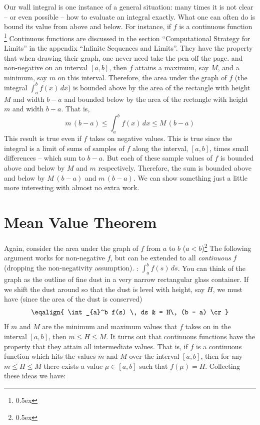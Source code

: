 Our wall integral is one instance of a general situation: many times it is
not clear -- or even possible -- how to evaluate an integral exactly. What one
can often do is bound its value from above and below.
For instance, if $f$ is a continuous function%
\footnote{\kern 0.5pt \raise 0.5ex \hbox{\dag}}%
{Continuous functions are discussed in the section ``Computational Strategy for Limits'' in the appendix ``Infinite Sequences and Limits''.
They have the property that when drawing their graph, one never need take the pen off the page.} 
and non-negative
on an interval $[a,b]$, then $f$ attains a maximum, say $M$, and a minimum, say $m$ on this interval. Therefore,
the area under the graph of $f$ (the integral $\int_a^b f(x) \, dx$) 
is bounded above by the area of the rectangle with height $M$ and
width $b-a$ and bounded below by the area of the rectangle with height $m$ and width $b-a$.
That is, 
$$
m \, (b-a) \le \int_a^b f(x) \, dx \le M\, (b-a) 
$$
This result is true even if $f$ takes on negative values. This is true since the integral is 
a limit of sums of samples of $f$ along the interval, $[a,b]$,  times small differences -- which sum to $b-a$.
But each of these 
sample values of $f$ is bounded above and below by $M$ and $m$ respectively. 
Therefore, the sum is bounded above and below by $M \,(b-a)$ and $m \, (b-a)$.
We can show something just a little 
more interesting with almost no extra work.
\section{Mean Value Theorem}
Again, consider the area under the graph of 
$f$ from $a$ to $b$ ($a<b$)\footnote{\kern 0.5pt \raise 0.5ex \hbox{\ddag}}%
{The following argument works for non-negative $f$, but can be extended to all {\it continuous\/} $f$ (dropping the non-negativity assumption).}
: $\int_a^b f(s) \, ds$.
You can think of the graph as the outline of 
fine dust in a very narrow rectangular glass container. If we shift the dust around so that the dust
is level with height, say $H$, we must have (since the area of the dust is conserved)
$$
\eqalign {
\int_{a}^b f(s) \, ds & = H\,  (b - a) \cr
}
$$
If $m$ and $M$ are the minimum and maximum values that $f$ takes on 
in the interval $[a,b]$, then $m \le H \le M$. It turns out that continuous functions have 
the property that they attain all intermediate values. That is, if $f$ is a continuous 
function which hits the values $m$
and $M$ over the interval $[a,b]$, then for any $ m \le H \le M$ there exists a value 
$\mu \in [a,b]$ such that $f(\mu) = H$. Collecting these ideas we have:

